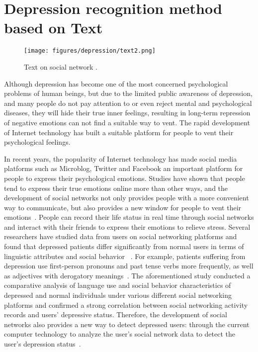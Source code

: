 
\ifx\allfiles\undefined
    
\fi

\section{Depression recognition method based on Text}
\label{sec_approach}

\begin{figure}[tbp]
	\centering	
	\label{fig_hard_case1}\texttt{[image: figures/depression/text2.png]}		
	\caption{
	Text on social network .
	}
	\label{text2}
\end{figure}

Although depression has become one of the most concerned psychological problems of human beings, but due to the limited public awareness of depression, and many people do not pay attention to or even reject mental and psychological diseases, they will hide their true inner feelings, resulting in long-term repression of negative emotions can not find a suitable way to vent. The rapid development of Internet technology has built a suitable platform for people to vent their psychological feelings.

In recent years, the popularity of Internet technology has made social media platforms such as Microblog, Twitter and Facebook an important platform for people to express their psychological emotions. Studies have shown that people tend to express their true emotions online more than other ways, and the development of social networks not only provides people with a more convenient way to communicate, but also provides a new window for people to vent their emotions~\cite{chancellor2020methods}. People can record their life status in real time through social networks and interact with their friends to express their emotions to relieve stress.
Several researchers have studied data from users on social networking platforms and found that depressed patients differ significantly from normal users in terms of linguistic attributes and social behavior ~\cite{chancellor2016quantifying,de2014mental,nguyen2014affective,wolohan2018detecting}. For example, patients suffering from depression use first-person pronouns and past tense verbs more frequently, as well as adjectives with derogatory meanings~\cite{rude2004language,nadeem2016identifying}.
The aforementioned study conducted a comparative analysis of language use and social behavior characteristics of depressed and normal individuals under various different social networking platforms and confirmed a strong correlation between social networking activity records and users' depressive status.
Therefore, the development of social networks also provides a new way to detect depressed users: through the current computer technology to analyze the user's social network data to detect the user's depression status~\cite{de2013predicting,magami2020automatic}.

